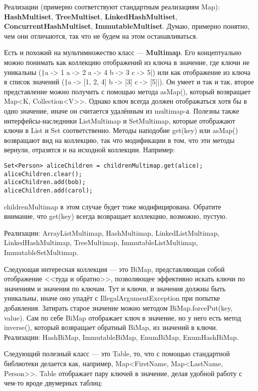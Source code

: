 \documentclass[a5paper,draft]{article}
\begin{document}
Реализации (примерно соответствуют стандартным реализациям Map): \textbf{HashMultiset}, \textbf{TreeMultiset}, \textbf{LinkedHashMultiset}, \textbf{ConcurrentHashMultiset}, \textbf{ImmutableMultiset}. Думаю, примерно понятно, чем они отличаются, так что не будем на этом останавливаться.

Есть и похожий на мультимножество класс --- \textbf{Multimap}. Его концептуально можно понимать как коллекцию отображений из ключа в значение, где ключи не уникальны (\texttt|a -> 1 a -> 2 a -> 4 b -> 3 c -> 5|) или как отображение из ключа в список значений (\texttt|a -> [1, 2, 4] b -> [3] c -> [5]|). Он умеет и так и так, второе представление можно получить с помощью метода asMap(), который возвращает Map<K, Collection<V>>. Однако ключ всегда должен отображаться хотя бы в одно значение, иначе он считается удалённым из multimap-а. Полезны также интерфейсы-наследники ListMultimap и SetMultimap, которые отображают ключи в List и Set соответственно. Методы наподобие get(key) или asMap() возвращают вид на коллекцию, так что модификации в том, что эти методы вернули, отразятся и на исходной коллекции. Например:

\begin{verbatim}
Set<Person> aliceChildren = childrenMultimap.get(alice);
aliceChildren.clear();
aliceChildren.add(bob);
aliceChildren.add(carol);
\end{verbatim}

childrenMultimap в этом случае будет тоже модифицирована. Обратите внимание, что get(key) всегда возвращает коллекцию, возможно, пустую.

Реализации: ArrayListMultimap, HashMultimap, LinkedListMultimap, LinkedHashMultimap, TreeMultimap, ImmutableListMultimap, ImmutableSetMultimap.

Следующая интересная коллекция --- это BiMap, представляющая собой отображение <<туда и обратно>>, позволяющее эффективно искать ключи по значениям и значения по ключам. Тут и ключи, и значения должны быть уникальны, иначе оно упадёт с IllegalArgumentException при попытке добавления. Затирать старое значение можно методом BiMap.forcePut(key, value). Сам по себе BiMap отображает ключ в значение, но у него есть метод inverse(), который возвращает обратный BiMap, из значений в ключи. Реализации: HashBiMap, ImmutableBiMap, EnumBiMap, EnumHashBiMap.

Следующий полезный класс --- это Table, то, что с помощью стандартной библиотеки делается как, например, Map<FirstName, Map<LastName, Person>>. Table отображает пару ключей в значение, делая удобной работу с чем-то вроде двумерных таблиц:
\end{document}
